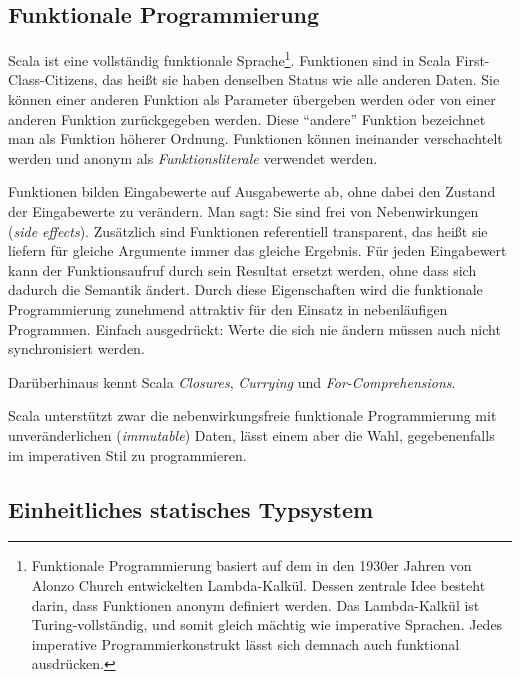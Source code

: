 \documentclass[a4paper, 12pt, hidelinks, listof=totoc, listoftables=totoc, bibliography=totoc]{scrreprt}
\begin{document}
\subsection{Funktionale Programmierung}


Scala ist eine vollständig funktionale Sprache\footnote{Funktionale Programmierung basiert auf dem in den 1930er Jahren von Alonzo Church entwickelten Lambda-Kalkül. Dessen zentrale Idee besteht darin, dass Funktionen anonym definiert werden. Das Lambda-Kalkül ist Turing-vollständig, und somit gleich mächtig wie imperative Sprachen. Jedes imperative Programmierkonstrukt lässt sich demnach auch funktional ausdrücken.}. Funktionen sind in Scala First-Class-Citizens, das heißt sie haben denselben Status wie alle anderen Daten. Sie können einer anderen Funktion als Parameter übergeben werden oder von einer anderen Funktion zurückgegeben werden. Diese "`andere"' Funktion bezeichnet man als Funktion höherer Ordnung. Funktionen können ineinander verschachtelt werden und anonym als \emph{Funktionsliterale} verwendet werden.

Funktionen bilden Eingabewerte auf Ausgabewerte ab, ohne dabei den Zustand der Eingabewerte zu verändern. Man sagt: Sie sind frei von Nebenwirkungen (\emph{side effects}). Zusätzlich sind Funktionen referentiell transparent, das heißt sie liefern für gleiche Argumente immer das gleiche Ergebnis. Für jeden Eingabewert kann der Funktionsaufruf durch sein Resultat ersetzt werden, ohne dass sich dadurch die Semantik ändert. Durch diese Eigenschaften wird die funktionale Programmierung zunehmend attraktiv für den Einsatz in nebenläufigen Programmen. Einfach ausgedrückt: Werte die sich nie ändern müssen auch nicht synchronisiert werden.

Darüberhinaus kennt Scala \emph{Closures}, \emph{Currying} und \emph{For-Comprehensions}.

Scala unterstützt zwar die nebenwirkungsfreie funktionale Programmierung mit unveränderlichen (\emph{immutable}) Daten, lässt einem aber die Wahl, gegebenenfalls im imperativen Stil zu programmieren. \cite[S. 6 ff.]{piepmeyer2010.GFP}\cite[S. 10 ff.]{odersky2008.PIS}

\subsection{Einheitliches statisches Typsystem}\label{subsec:scala-types}
\end{document}
